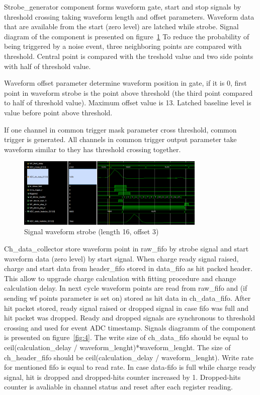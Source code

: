 \documentclass{article}
\begin{document}
Strobe\_generator component forms waveform gate, start and stop signals by threshold crossing taking waveform length and offset parameters. Waveform data that are available from the start (zero level) are latched while strobe. Signal diagram of the component is presented on figure~\ref{fig:3} To reduce the probability of being triggered by a noise event, three neighboring points are compared with threshold. Central point is compared with the treshold value and two side points with half of threshold value.

Waveform offset parameter determine waveform position in gate, if it is 0, first point in waveform strobe is  the point above threshold (the third point compared to half of threshold value). Maximum offset value is 13. Latched baseline level is value before point above threshold.

If one channel in common trigger mask parameter cross threshold, common trigger is generated. All channels in common trigger output parameter take waveform similar to they has threshold crossing together.

\begin{figure}[H]
	\centering 
	\includegraphics[width=0.8\textwidth]{wf_strobe_diag_sim.png}
	\caption{\label{fig:3} Signal waveform strobe (length 16, offset 3)}
\end{figure}


Ch\_data\_collector store waveform point in raw\_fifo by strobe signal and start waveform data (zero level) by start signal. When charge ready signal raised, charge and start data from header\_fifo stored in data\_fifo as hit packed header. This allow to upgrade charge calculation with fitting procedure and change calculation delay. In next cycle waveform points are read from raw\_fifo and (if sending wf points parameter is set on) stored as hit data in ch\_data\_fifo. After hit packet stored, ready signal raised or dropped signal in case fifo was full and hit packet was dropped. Ready and dropped signals are synchronous to threshold crossing and used for event ADC timestamp.  Signals diagramm of the component is presented on figure~\ref{fig:4}. The write size of ch\_data\_fifo should be equal to ceil(calculation\_delay / waveform\_lenght)*waveform\_lenght. The size of ch\_header\_fifo should be ceil(calculation\_delay / waveform\_lenght). Write rate for mentioned fifo is equal to read rate.
In case data-fifo is full while charge ready signal, hit is dropped and dropped-hits counter increased by 1. Dropped-hits counter is avaliable in channel status and reset after each register reading.
\end{document}
